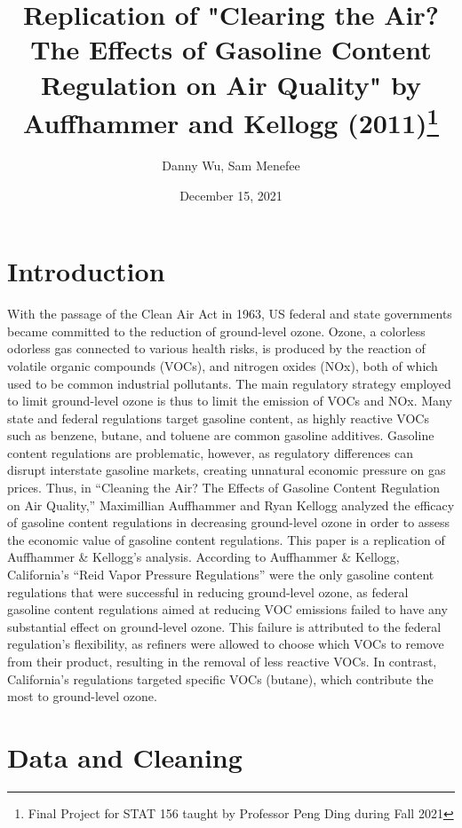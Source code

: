 \documentclass{article}
\title{
    \Large Replication of "Clearing the Air? The Effects of Gasoline Content
Regulation on Air Quality" by Auffhammer and Kellogg (2011)\footnote{Final Project for STAT 156 taught by Professor Peng Ding during Fall 2021}}
\author{Danny Wu, Sam Menefee}
\date{December 15, 2021}
\begin{document}
\maketitle

\section{Introduction}

With the passage of the Clean Air Act in 1963, US federal and state governments became committed to the reduction of ground-level ozone. Ozone, a colorless odorless gas connected to various health risks, is produced by the reaction of volatile organic compounds (VOCs), and nitrogen oxides (NOx), both of which used to be common industrial pollutants. The main regulatory strategy employed to limit ground-level ozone is thus to limit the emission of VOCs and NOx. Many state and federal regulations target gasoline content, as highly reactive VOCs such as benzene, butane, and toluene are common gasoline additives. Gasoline content regulations are problematic, however, as regulatory differences can disrupt interstate gasoline markets, creating unnatural economic pressure on gas prices. Thus, in “Cleaning the Air? The Effects of Gasoline Content Regulation on Air Quality,” Maximillian Auffhammer and Ryan Kellogg analyzed the efficacy of gasoline content regulations in decreasing ground-level ozone in order to assess the economic value of gasoline content regulations. This paper is a replication of Auffhammer \& Kellogg’s analysis. According to Auffhammer \& Kellogg, California’s “Reid Vapor Pressure Regulations” were the only gasoline content regulations that were successful in reducing ground-level ozone, as federal gasoline content regulations aimed at reducing VOC emissions failed to have any substantial effect on ground-level ozone. This failure is attributed to the federal regulation’s flexibility, as refiners were allowed to choose which VOCs to remove from their product, resulting in the removal of less reactive VOCs. In contrast, California’s regulations targeted specific VOCs (butane), which contribute the most to ground-level ozone. 

\section{Data and Cleaning}
\end{document}
